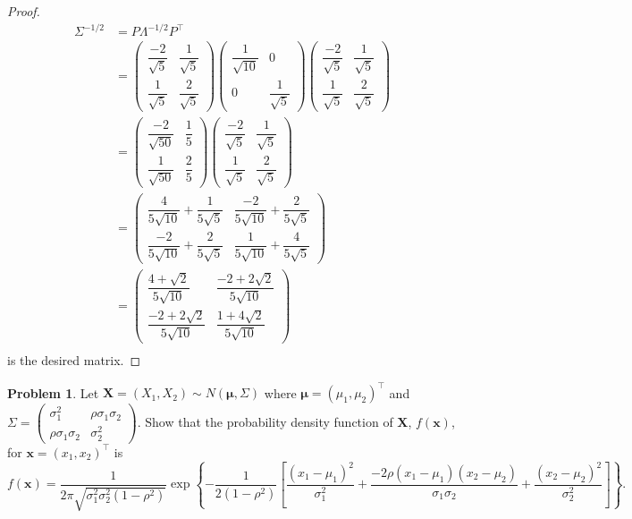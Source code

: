 \documentclass[12pt]{article}
\theoremstyle{definition}
\newtheorem{problem}{Problem}
\newcommand{\vect}[1]{\boldsymbol{#1}}
\begin{document}
\begin{proof}
  \begin{align*}
    \Sigma^{-1/2}
    &= P \Lambda^{-1/2} P^\intercal \\
    &= \begin{pmatrix} \dfrac{-2}{\sqrt{5}} & \dfrac{1}{\sqrt{5}} \\ \dfrac{1}{\sqrt{5}} & \dfrac{2}{\sqrt{5}} \end{pmatrix}
    \begin{pmatrix} \dfrac{1}{\sqrt{10}} & 0 \\ 0 & \dfrac{1}{\sqrt{5}} \end{pmatrix}
    \begin{pmatrix} \dfrac{-2}{\sqrt{5}} & \dfrac{1}{\sqrt{5}} \\ \dfrac{1}{\sqrt{5}} & \dfrac{2}{\sqrt{5}} \end{pmatrix} \\
    &= \begin{pmatrix} \dfrac{-2}{\sqrt{50}} & \dfrac{1}{5} \\ \dfrac{1}{\sqrt{50}} & \dfrac{2}{5} \end{pmatrix} \begin{pmatrix} \dfrac{-2}{\sqrt{5}} & \dfrac{1}{\sqrt{5}} \\ \dfrac{1}{\sqrt{5}} & \dfrac{2}{\sqrt{5}} \end{pmatrix}\\
    &= \begin{pmatrix} \dfrac{4}{5\sqrt{10}} + \dfrac{1}{5\sqrt{5}} & \dfrac{-2}{5\sqrt{10}} + \dfrac{2}{5\sqrt{5}} \\ \dfrac{-2}{5\sqrt{10}} + \dfrac{2}{5\sqrt{5}} & \dfrac{1}{5\sqrt{10}} + \dfrac{4}{5\sqrt{5}} \end{pmatrix}\\
    &= \begin{pmatrix} \dfrac{4 + \sqrt{2}}{5\sqrt{10}} & \dfrac{-2 + 2\sqrt{2}}{5\sqrt{10}} \\ \dfrac{-2 + 2\sqrt{2}}{5\sqrt{10}} & \dfrac{1 + 4\sqrt{2}}{5\sqrt{10}} \end{pmatrix} \\
  \end{align*}
  is the desired matrix.

\end{proof}

\begin{problem}
  Let $\vect{X} = (X_1, X_2) \sim N(\vect{\mu}, \Sigma)$ where
  $\vect{\mu} = (\mu_1, \mu_2)^\intercal$ and $\Sigma = \begin{pmatrix} \sigma_1^2 & \rho\sigma_1\sigma_2 \\ \rho\sigma_1\sigma_2 & \sigma_2^2 \end{pmatrix}.$
  Show that the probability density function of $\vect{X}$, $f(\vect{x})$, for $\vect{x} = (x_1, x_2)^\intercal$ is
  \[
    f(\vect{x}) = \frac{1}{2\pi \sqrt{\sigma_1^2\sigma_2^2(1 - \rho^2)}} \exp\left\{ -\frac{1}{2(1 - \rho^2)} \left[ \frac{(x_1 - \mu_1)^2}{\sigma_1^2} + \frac{-2\rho(x_1 - \mu_1)(x_2 - \mu_2)}{\sigma_1\sigma_2} + \frac{(x_2 - \mu_2)^2}{\sigma_2^2}\right] \right\}.
  \]
\end{problem}
\end{document}
